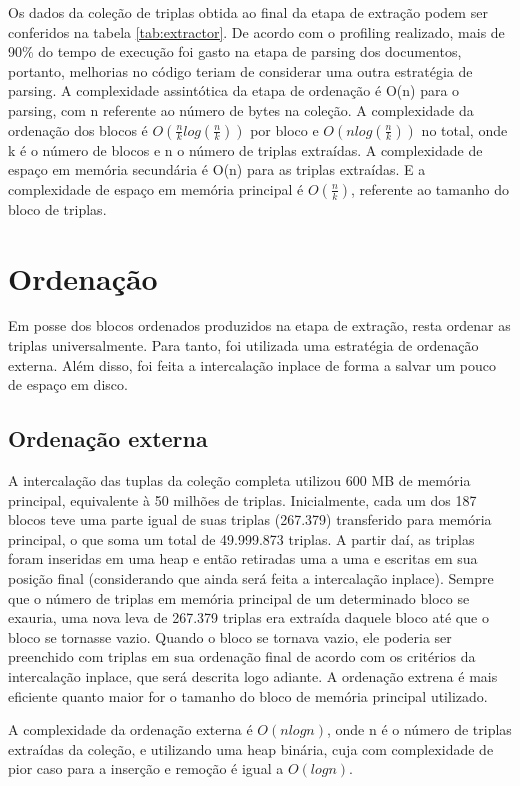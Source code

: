 \documentclass{report}
\begin{document}
Os dados da coleção de triplas obtida ao final da etapa de extração podem ser conferidos na tabela \ref{tab:extractor}. De acordo
com o profiling realizado, mais de 90\% do tempo de execução foi gasto na etapa de parsing dos documentos, portanto, melhorias
no código teriam de considerar uma outra estratégia de parsing. A complexidade assintótica da etapa de ordenação é O(n) para o 
parsing, com n referente ao número de bytes na coleção. A complexidade da ordenação dos blocos é $ O(\frac{n}{k}log(\frac{n}{k})) $
por bloco e  $ O(nlog(\frac{n}{k})) $ no total, onde k é o número de blocos e n o número de triplas extraídas. A complexidade de espaço 
em memória secundária é O(n) para as triplas extraídas. E a complexidade de espaço em memória principal é $ O(\frac{n}{k}) $, 
referente ao tamanho do bloco de triplas.

\section{Ordenação}

Em posse dos blocos ordenados produzidos na etapa de extração, resta ordenar as triplas universalmente.
Para tanto, foi utilizada uma estratégia de ordenação externa. Além disso, foi feita a intercalação inplace
de forma a salvar um pouco de espaço em disco.

\subsection{Ordenação externa}

A intercalação das tuplas da coleção completa utilizou 600 MB de memória principal, equivalente à 50 milhões de triplas. 
Inicialmente, cada um dos 187 blocos teve uma parte igual de suas triplas (267.379) transferido para memória principal, o que soma um total de
49.999.873 triplas. A partir daí, as triplas foram inseridas em uma heap e então retiradas uma a uma e escritas em sua posição final (considerando
que ainda será feita a intercalação inplace). Sempre que o número de triplas em memória principal de um determinado bloco se exauria, uma nova leva
de 267.379 triplas era extraída daquele bloco até que o bloco se tornasse vazio. Quando o bloco
se tornava vazio, ele poderia ser preenchido com triplas em sua ordenação final de acordo com os critérios da intercalação inplace, que será descrita logo
adiante. A ordenação extrena é mais eficiente quanto maior for o tamanho do bloco de memória principal utilizado.

A complexidade da ordenação externa é $ O(nlog n) $, onde n é o número de triplas extraídas da coleção, e utilizando uma heap
binária, cuja com complexidade de pior caso para a inserção e remoção é igual a $ O(log n)$.
\end{document}
